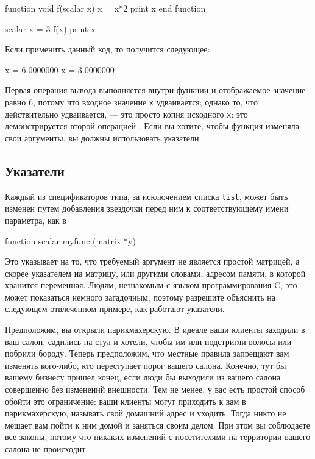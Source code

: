 \begin{code}
function void f(scalar x)
    x = x*2
    print x
end function

scalar x = 3
f(x)
print x
\end{code}
Если применить данный код, то получится следующее:
\begin{code}
              x =  6.0000000
              x =  3.0000000
\end{code}
Первая операция вывода  выполняется внутри функции и
отображаемое значение равно 6, потому что входное значение \verb|x|
удваивается; однако то, что действительно удваивается, --- это просто
копия исходного \verb|x|: это демонстрируется второй операцией
. Если вы хотите, чтобы функция изменяла свои аргументы, вы
должны использовать указатели.


\subsection{Указатели}

Каждый из спецификаторов типа, за исключением списка \texttt{list},
может быть изменен путем добавления звездочки перед ним к
соответствующему имени параметра, как в

%    
\begin{code}
function scalar myfunc (matrix *y)
\end{code}
Это указывает на то, что требуемый аргумент не является простой
матрицей, а скорее указателем на матрицу, или другими словами, адресом
памяти, в которой хранится переменная.  Людям, незнакомым с языком
программирования C, это может показаться немного загадочным, поэтому
разрешите объяснить на следующем отвлеченном примере, как работают
указатели.

Предположим, вы открыли парикмахерскую. В идеале ваши клиенты заходили
в ваш салон, садились на стул и хотели, чтобы им или подстригли волосы
или побрили бороду. Теперь предположим, что местные правила запрещают
вам изменять кого-либо, кто переступает порог вашего салона. Конечно,
тут бы вашему бизнесу пришел конец, если люди бы выходили из вашего
салона совершенно без изменений внешности. Тем не менее, у вас есть
простой способ обойти это ограничение: ваши клиенты могут приходить к
вам в парикмахерскую, называть свой домашний адрес и уходить. Тогда
никто не мешает вам пойти к ним домой и заняться своим делом. При этом
вы соблюдаете все законы, потому что никаких изменений с посетителями
на территории вашего салона не происходит.

